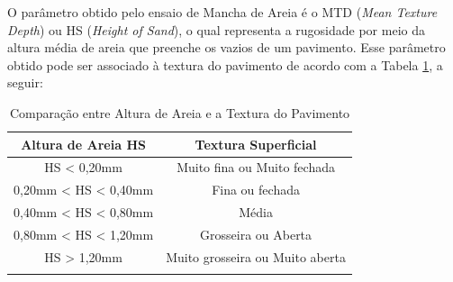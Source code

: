 O parâmetro obtido pelo ensaio de Mancha de Areia é o MTD (\emph{Mean Texture Depth}) ou HS (\emph{Height of Sand}), o qual representa a rugosidade por meio da altura média de areia que preenche os vazios de um pavimento. Esse parâmetro obtido pode ser associado à textura do pavimento de acordo com a Tabela \ref{tab:alturadeareia}, a seguir: 
\vspace{0.5cm}
\begin{table}[htb!]
\centering
\caption{Comparação entre Altura de Areia e a Textura do Pavimento}
\label{tab:alturadeareia}
\begin{tabular}{cc}
\hline
Altura de Areia HS & \multicolumn{1}{c}{Textura Superficial} \\ \hline
HS < 0,20mm              & Muito fina ou Muito fechada                            \\
0,20mm < HS < 0,40mm              & Fina ou fechada                            \\
0,40mm < HS < 0,80mm              & Média                           \\
0,80mm < HS < 1,20mm              & Grosseira ou Aberta                         \\
HS > 1,20mm              & Muito grosseira ou Muito aberta                            \\ \hline
\vspace{0cm}
\end{tabular}\\
\\
\end{table}


